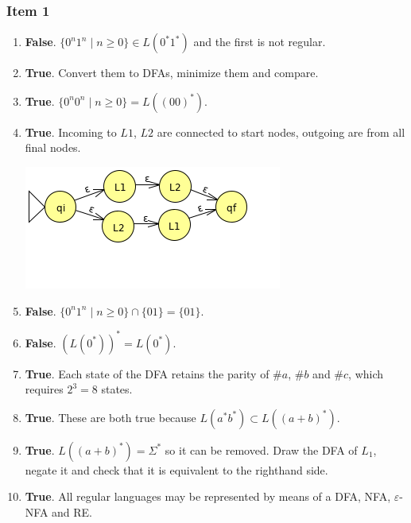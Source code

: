 \documentclass[docid=2012]{tcom_test1}
\begin{document}
\subsubsection{Item 1}
\begin{enumerate}[label=(\alph*)]
	\item \textbf{False}. $\{0^n1^n\mid n \geq 0\} \in L(0^*1^*)$ and the first is not regular.
	\item \textbf{True}. Convert them to DFAs, minimize them and compare.
	\item \textbf{True}. $\{0^n0^n\mid n \geq 0\}=L((00)^*)$.
	\item \textbf{True}. Incoming to $L1$, $L2$ are connected to start nodes, outgoing are from all final nodes.
	\begin{center} \includegraphics[scale=0.5,trim={0 20mm 0 0},clip]{2012T1_8_1d} \end{center}
	\item \textbf{False}. $\{0^n1^n\mid n \geq 0\} \cap \{01\} = \{01\}$.
	\item \textbf{False}. $(L(0^*))^*=L(0^*)$.
	\item \textbf{True}. Each state of the DFA retains the parity of $\#a$, $\#b$ and $\#c$, which requires $2^3=8$ states.
	\item \textbf{True}. These are both true because $L(a^*b^*) \subset L((a+b)^*)$.
	\item \textbf{True}. $L((a+b)^*)=\Sigma^*$ so it can be removed. Draw the DFA of $L_1$, negate it and check that it is equivalent to the righthand side.
	\item \textbf{True}. All regular languages may be represented by means of a DFA, NFA, $\varepsilon$-NFA and RE.
\end{enumerate}
\end{document}
